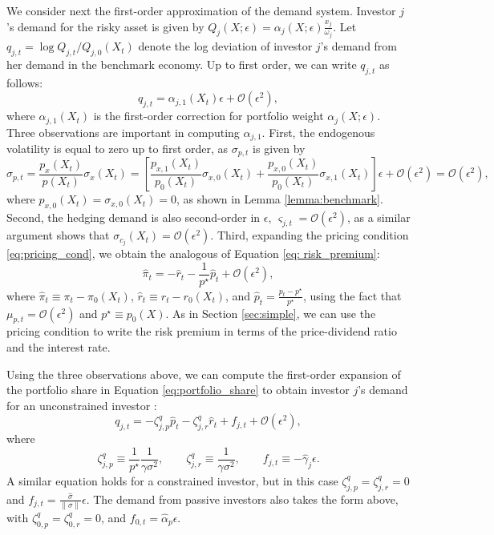 We consider next the first-order approximation of the demand system. 
Investor $j$'s demand for the risky asset is given by $Q_{j}(X;\epsilon) = \alpha_{j}(X;\epsilon) \frac{x_{j}}{\omega_{j}}.$ 
Let $q_{j,t} = \log Q_{j,t} / Q_{j,0}(X_t)$ denote the log deviation of investor $j$'s demand from her demand in the benchmark economy. Up to first order, we can write $q_{j,t}$ as follows:
\begin{equation}
    q_{j,t} = \alpha_{j,1}(X_t) \epsilon + \mathcal{O}(\epsilon^2),
\end{equation}
where $\alpha_{j,1}(X_t) $ is the first-order correction for portfolio weight $\alpha_j(X;\epsilon)$. Three observations are important in computing $\alpha_{j,1}$. First, the endogenous volatility is equal to zero up to first order, as $\sigma_{p,t}$ is given by 
\begin{equation}
    \sigma_{p,t} = \frac{p_x(X_t)}{p(X_t)} \sigma_x(X_t) = \left[ \frac{p_{x,1}(X_t)}{p_0(X_t)} \sigma_{x,0}(X_t) +\frac{p_{x,0}(X_t)}{p_0(X_t)} \sigma_{x,1}(X_t) \right] \epsilon + \mathcal{O}(\epsilon^2) = \mathcal{O}(\epsilon^2),
\end{equation}
where $p_{x,0}(X_t) = \sigma_{x,0}(X_t) = 0$, as shown in Lemma \ref{lemma:benchmark}. Second, the hedging demand is also second-order in $\epsilon$, $\varsigma_{j,t} = \mathcal{O}(\epsilon^2)$,
as a similar argument shows that $\sigma_{c_j}(X_t) = \mathcal{O}(\epsilon^2)$. Third, expanding the pricing condition \eqref{eq:pricing_cond}, we obtain the analogous of Equation \eqref{eq: risk_premium}:
\begin{equation}
\hat{\pi}_t = - \hat{r}_t - \frac{1}{p^\star} \hat{p}_t + \mathcal{O}(\epsilon^2),
\end{equation}
where $\hat{\pi}_t \equiv \pi_t - \pi_0(X_t)$, $\hat{r}_t \equiv r_t - r_0(X_t)$, and $\hat{p}_t = \frac{p_t - p^\star}{p^\star}$, using the fact that $\mu_{p,t} = \mathcal{O}(\epsilon^2)$ and $p^\star \equiv p_0(X)$. 
As in Section \ref{sec:simple}, we can use the pricing condition to write the risk premium in terms of the price-dividend ratio and the interest rate.

Using the three observations above, we can compute the first-order expansion of the portfolio share in Equation \eqref{eq:portfolio_share} to obtain investor $j$'s demand for an unconstrained investor :
\begin{equation}\label{eq:demand_risky}
    q_{j,t} = -\zeta^q_{j, p} \hat{p}_t - \zeta^q_{j,r} \hat{r}_t + f_{j,t} + \mathcal{O}(\epsilon^2), 
\end{equation}
where $$\zeta_{j,p}^q \equiv \frac{1}{p^\star} \frac{1}{\gamma \sigma^2}, \qquad \zeta_{j,r}^q \equiv \frac{1}{\gamma \sigma^2}, \qquad f_{j,t} \equiv -\hat{\gamma}_j \epsilon.$$ 
A similar equation holds for a constrained investor, but in this case $\zeta_{j,p}^q = \zeta_{j,r}^q = 0$ and $f_{j,t} = \frac{\hat{\sigma}}{\|\sigma\|} \epsilon$. 
The demand from passive investors also takes the form above, with $\zeta_{0,p}^q = \zeta_{0,r}^q = 0$, and $f_{0,t} = \hat{\alpha}_{p} \epsilon$.

